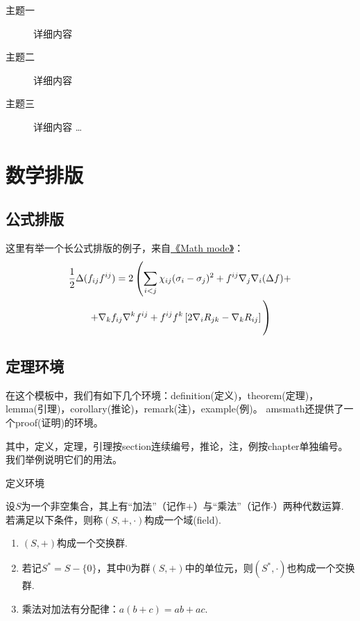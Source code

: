 \begin{description}
	\item[主题一] 详细内容
	\item[主题二] 详细内容
	\item[主题三] 详细内容 \ldots
\end{description}

\section{数学排版}

\subsection{公式排版}

这里有举一个长公式排版的例子，来自\href{http://www.tex.ac.uk/tex-archive/info/math/voss/mathmode/Mathmode.pdf}{《Math mode》}：
\begin{multline}
\frac {1}{2}\Delta (f_{ij}f^{ij})=
2\left (\sum _{i<j}\chi _{ij}(\sigma _{i}-
\sigma _{j}) ^{2}+ f^{ij}\nabla _{j}\nabla _{i}(\Delta f)+\right .\\
\left .+\nabla _{k}f_{ij}\nabla ^{k}f^{ij}+
f^{ij}f^{k}\left [2\nabla _{i}R_{jk}-
\nabla _{k}R_{ij}\right ]\vphantom {\sum_{i<j}}\right )
\end{multline}

\subsection{定理环境}

在这个模板中，我们有如下几个环境：definition(定义)，theorem(定理)，lemma(引理)，corollary(推论)，remark(注)，example(例)。
amsmath还提供了一个proof(证明)的环境。

其中，定义，定理，引理按section连续编号，推论，注，例按chapter单独编号。
我们举例说明它们的用法。

定义环境
\begin{definition}[域]\label{def:field}
	设$S$为一个非空集合，其上有“加法”（记作$+$）与“乘法”（记作$\cdot$）两种代数运算. 若满足以下条件，则称$(S,+,\cdot)$构成一个域(field).
	\begin{enumerate}[label={\rm{\roman*)}}]
		\item $(S,+)$构成一个交换群.
		\item 若记$S^{*}=S-\{0\}$，其中$0$为群$(S,+)$中的单位元，则$(S^{*},\cdot)$也构成一个交换群.
		\item 乘法对加法有分配律：$a ( b + c ) = a b + a c$.
	\end{enumerate}
\end{definition}

